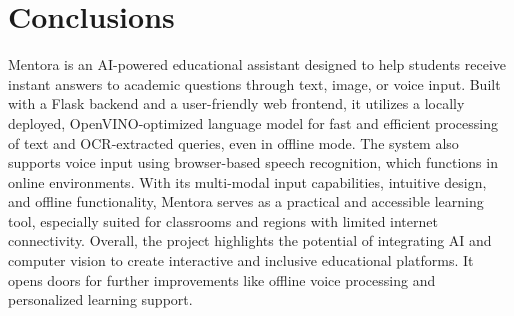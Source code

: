 \documentclass{josis}
\begin{document}
\section{Conclusions}
Mentora is an AI-powered educational assistant designed to help students receive instant answers to academic questions through text, image, or voice input. Built with a Flask backend and a user-friendly web frontend, it utilizes a locally deployed, OpenVINO-optimized language model for fast and efficient processing of text and OCR-extracted queries, even in offline mode. The system also supports voice input using browser-based speech recognition, which functions in online environments. With its multi-modal input capabilities, intuitive design, and offline functionality, Mentora serves as a practical and accessible learning tool, especially suited for classrooms and regions with limited internet connectivity. Overall, the project highlights the potential of integrating AI and computer vision to create interactive and inclusive educational platforms. It opens doors for further improvements like offline voice processing and personalized learning support.
\end{document}
